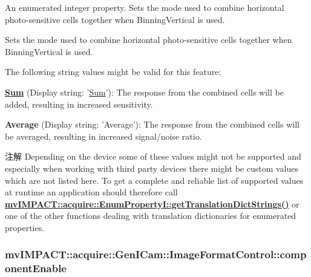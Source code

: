 An enumerated integer property. Sets the mode used to combine horizontal photo-\/sensitive cells together when Binning\+Vertical is used. 

Sets the mode used to combine horizontal photo-\/sensitive cells together when Binning\+Vertical is used.

The following string values might be valid for this feature\+:
\begin{DoxyItemize}
\item {\bfseries \hyperlink{class_sum}{Sum}} (Display string\+: '\hyperlink{class_sum}{Sum}')\+: The response from the combined cells will be added, resulting in increased sensitivity.
\item {\bfseries Average} (Display string\+: 'Average')\+: The response from the combined cells will be averaged, resulting in increased signal/noise ratio.
\end{DoxyItemize}

\begin{DoxyNote}{注解}
Depending on the device some of these values might not be supported and especially when working with third party devices there might be custom values which are not listed here. To get a complete and reliable list of supported values at runtime an application should therefore call {\bfseries \hyperlink{classmv_i_m_p_a_c_t_1_1acquire_1_1_enum_property_i_a0ba6ccbf5ee69784d5d0b537924d26b6}{mv\+I\+M\+P\+A\+C\+T\+::acquire\+::\+Enum\+Property\+I\+::get\+Translation\+Dict\+Strings()}} or one of the other functions dealing with translation dictionaries for enumerated properties. 
\end{DoxyNote}
\hypertarget{classmv_i_m_p_a_c_t_1_1acquire_1_1_gen_i_cam_1_1_image_format_control_a12e4c6659914f9a24825c2f4a0720cfe}{
\subsubsection[{component\+Enable}]{ mv\+I\+M\+P\+A\+C\+T\+::acquire\+::\+Gen\+I\+Cam\+::\+Image\+Format\+Control\+::component\+Enable}}\label{classmv_i_m_p_a_c_t_1_1acquire_1_1_gen_i_cam_1_1_image_format_control_a12e4c6659914f9a24825c2f4a0720cfe}



